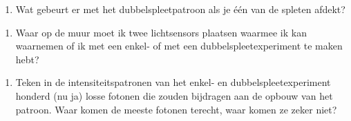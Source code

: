 \documentclass[../../main.tex]{subfiles}
\begin{document}
\begin{enumerate}[resume]
\item Wat gebeurt er met het dubbelspleetpatroon als je \'e\'en van de spleten afdekt?
\end{enumerate}

\notepadlines[4]
\vspace{0.125in}

\begin{enumerate}[resume]
\item Waar op de muur moet ik twee lichtsensors plaatsen waarmee ik kan waarnemen of ik met een enkel- of met een dubbel\-spleetexperiment te maken hebt?
\end{enumerate}

\notepadlines[4]
\vspace{0.125in}

\begin{enumerate}[resume]
\item Teken in de intensiteitspatronen van het enkel- en dubbel\-spleetexperiment honderd (nu ja) losse fotonen die zouden bijdragen aan de opbouw van het patroon. Waar komen de meeste fotonen terecht, waar komen ze zeker niet?
\end{enumerate}
\end{document}
